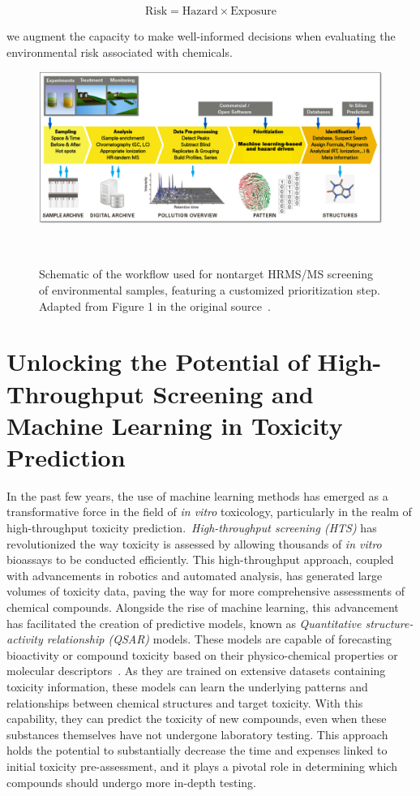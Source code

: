 \begin{equation}
    \text{Risk} = \text{Hazard} \times \text{Exposure}
\end{equation}

we augment the capacity to make well-informed decisions when evaluating the environmental risk associated with chemicals.

 
\begin{figure}[htbp]  %
    \centering
    \includegraphics[width=1.0\textwidth]{figures/non_target_high_resolution_mass_spectrometry.png}  
    \caption{Schematic of the workflow used for nontarget HRMS/MS screening of environmental samples, featuring a customized prioritization step. Adapted from Figure 1 in the original source~\cite{hollender}.}
~\label{fig:non_target_high_resolution_mass_spectrometry} 
\end{figure}

\section{Unlocking the Potential of High-Throughput Screening and Machine Learning in Toxicity Prediction}

In the past few years, the use of machine learning methods has emerged as a transformative force in the field of \emph{in vitro} toxicology, particularly in the realm of high-throughput toxicity prediction.~\emph{High-throughput screening (HTS)} has revolutionized the way toxicity is assessed by allowing thousands of \emph{in vitro} bioassays to be conducted efficiently. This high-throughput approach, coupled with advancements in robotics and automated analysis, has generated large volumes of toxicity data, paving the way for more comprehensive assessments of chemical compounds.
Alongside the rise of machine learning, this advancement has facilitated the creation of predictive models, known as \emph{Quantitative structure-activity relationship (QSAR)} models. These models are capable of forecasting bioactivity or compound toxicity based on their physico-chemical properties or molecular descriptors~\cite{banerjee2018}. As they are trained on extensive datasets containing toxicity information, these models can learn the underlying patterns and relationships between chemical structures and target toxicity. With this capability, they can predict the toxicity of new compounds, even when these substances themselves have not undergone laboratory testing. This approach holds the potential to substantially decrease the time and expenses linked to initial toxicity pre-assessment, and it plays a pivotal role in determining which compounds should undergo more in-depth testing.

